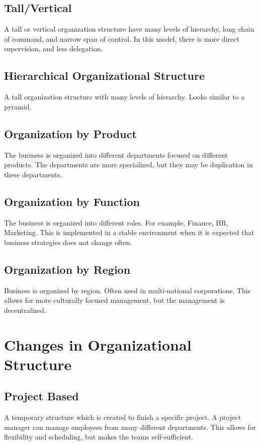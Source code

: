 \documentclass{report}
\begin{document}
\subsection{Tall/Vertical}
A tall or vertical organization structure have many levels of hierarchy, long chain of command, and narrow span of control.
In this model, there is more direct supervision, and less delegation.

\subsection{Hierarchical Organizational Structure}
A tall organization structure with many levels of hierarchy.
Looks similar to a pyramid.

\subsection{Organization by Product}
The business is organized into different departments focused on different products.
The departments are more specialized, but they may be duplication in these departments.

\subsection{Organization by Function}
The business is organized into different roles. 
For example, Finance, HR, Marketing.
This is implemented in a stable environment when it is expected that business strategies does not change often.

\subsection{Organization by Region}
Business is organized by region.
Often used in multi-national corporations.
This allows for more culturally focused management, but the management is decentralized.

\section{Changes in Organizational Structure}
\subsection{Project Based}
A temporary structure which is created to finish a specific project.
A project manager can manage employees from many different departments.
This allows for flexibility and scheduling, but makes the teams self-sufficient.
\end{document}
